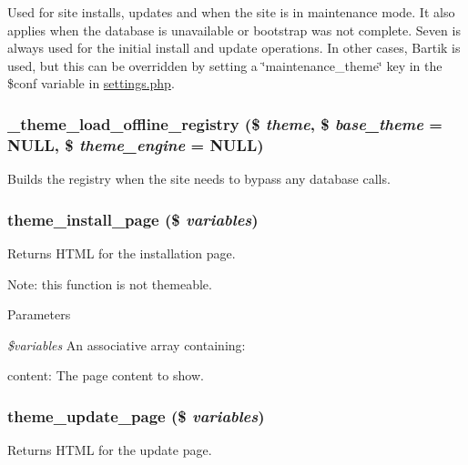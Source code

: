 Used for site installs, updates and when the site is in maintenance mode. It also applies when the database is unavailable or bootstrap was not complete. Seven is always used for the initial install and update operations. In other cases, Bartik is used, but this can be overridden by setting a \char`\"{}maintenance\_\-theme\char`\"{} key in the \$conf variable in \hyperlink{settings_8php}{settings.php}. \hypertarget{theme_8maintenance_8inc_a7bf7a7faa37b3475038eca9a2ecf97e5}{
\subsubsection[{\_\-theme\_\-load\_\-offline\_\-registry}]{\setlength{\rightskip}{0pt plus 5cm}\_\-theme\_\-load\_\-offline\_\-registry (\$ {\em theme}, \/  \$ {\em base\_\-theme} = {\ttfamily NULL}, \/  \$ {\em theme\_\-engine} = {\ttfamily NULL})}}
\label{theme_8maintenance_8inc_a7bf7a7faa37b3475038eca9a2ecf97e5}
Builds the registry when the site needs to bypass any database calls. \hypertarget{theme_8maintenance_8inc_a7d807e760c99d03293eb438cbccbfefe}{
\subsubsection[{theme\_\-install\_\-page}]{\setlength{\rightskip}{0pt plus 5cm}theme\_\-install\_\-page (\$ {\em variables})}}
\label{theme_8maintenance_8inc_a7d807e760c99d03293eb438cbccbfefe}
Returns HTML for the installation page.

Note: this function is not themeable.


\begin{DoxyParams}{Parameters}
\item[{\em \$variables}]An associative array containing:
\begin{DoxyItemize}
\item content: The page content to show. 
\end{DoxyItemize}\end{DoxyParams}
\hypertarget{theme_8maintenance_8inc_a76bf88a41655c58542abe7c3d1c3cb39}{
\subsubsection[{theme\_\-update\_\-page}]{\setlength{\rightskip}{0pt plus 5cm}theme\_\-update\_\-page (\$ {\em variables})}}
\label{theme_8maintenance_8inc_a76bf88a41655c58542abe7c3d1c3cb39}
Returns HTML for the update page.

